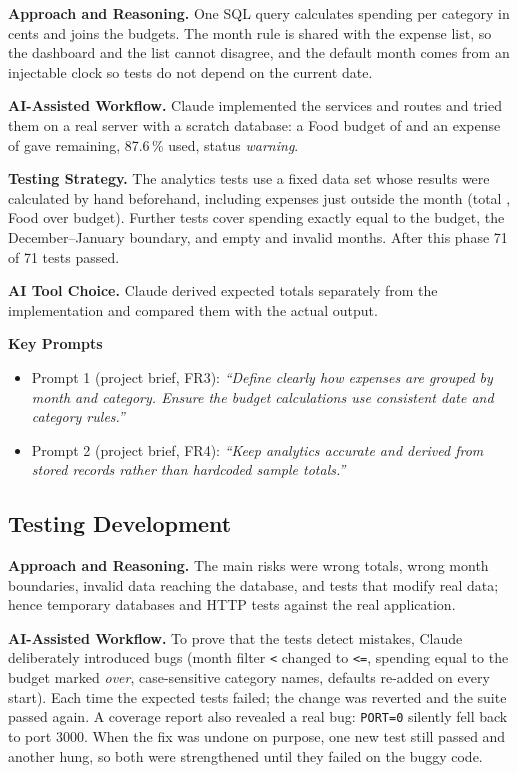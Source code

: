 \documentclass[11pt,a4paper]{article}
\newcommand{\prompt}[1]{\textit{``#1''}}
\begin{document}
\textbf{Approach and Reasoning.} One SQL query calculates spending per
category in cents and joins the budgets. The month rule is shared with
the expense list, so the dashboard and the list cannot disagree, and the
default month comes from an injectable clock so tests do not depend on
the current date.

\textbf{AI-Assisted Workflow.} Claude implemented the services and
routes and tried them on a real server with a scratch database: a Food
budget of  and an expense of  gave
 remaining, 87.6\,\% used, status \emph{warning}.

\textbf{Testing Strategy.} The analytics tests use a fixed data set whose
results were calculated by hand beforehand, including expenses just
outside the month (total , Food  over
budget). Further tests cover spending exactly equal to the budget, the
December--January boundary, and empty and invalid months. After this
phase 71 of 71 tests passed.

\textbf{AI Tool Choice.} Claude derived expected totals separately from
the implementation and compared them with the actual output.

\textbf{Key Prompts}
\begin{itemize}
    \item Prompt 1 (project brief, FR3): \prompt{Define clearly how expenses are grouped by month and category. Ensure the budget calculations use consistent date and category rules.}
    \item Prompt 2 (project brief, FR4): \prompt{Keep analytics accurate and derived from stored records rather than hardcoded sample totals.}
\end{itemize}

\subsection{Testing Development}

\textbf{Approach and Reasoning.} The main risks were wrong totals, wrong
month boundaries, invalid data reaching the database, and tests that
modify real data; hence temporary databases and HTTP tests against the
real application.

\textbf{AI-Assisted Workflow.} To prove that the tests detect mistakes,
Claude deliberately introduced bugs (month filter \texttt{<} changed to
\texttt{<=}, spending equal to the budget marked \emph{over},
case-sensitive category names, defaults re-added on every start). Each
time the expected tests failed; the change was reverted and the suite
passed again. A coverage report also revealed a real bug:
\texttt{PORT=0} silently fell back to port 3000. When the fix was undone
on purpose, one new test still passed and another hung, so both were
strengthened until they failed on the buggy code.
\end{document}
